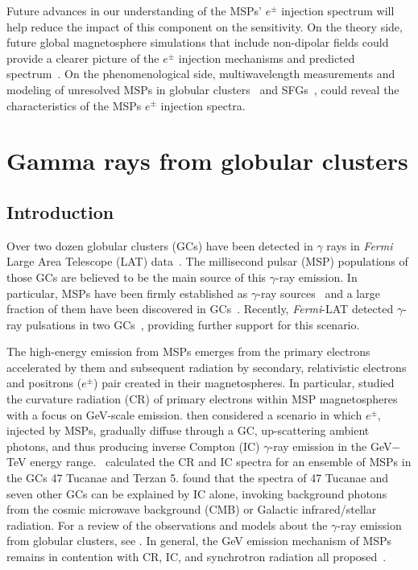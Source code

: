 \documentclass[doublespace,draft,nopageskip]{VTthesis} %
\begin{document}
Future advances in our understanding of the MSPs' $e^\pm$ injection spectrum will help reduce the impact of this component on the sensitivity. On the theory side, future global magnetosphere simulations that include non-dipolar fields could provide a clearer picture of the $e^\pm$ injection mechanisms and predicted spectrum~\citep{Harding:2021yuv}. On the phenomenological side, multiwavelength measurements and modeling of unresolved MSPs in globular clusters~\citep{Ndiyavala:2017hoh, Song:2021zrs} and SFGs~\citep{Sudoh:2020hyu}, could reveal the characteristics of the MSPs $e^\pm$ injection spectra. 

\chapter{Gamma rays from globular clusters} \label{ch:globular_cluster}

\section{Introduction}\label{sec:intro}

Over two dozen globular clusters (GCs) have been detected in $\gamma$ rays in {\it Fermi} Large Area Telescope (LAT) data~\citep{2009Sci...325..845A,2010A&A...524A..75A,2010ApJ...712L..36K,2011ApJ...729...90T,2015MNRAS.448.3215Z,2016MNRAS.459...99Z}. The millisecond pulsar (MSP) populations of those GCs are believed to be the main source of this $\gamma$-ray emission. In particular, MSPs have been firmly established as $\gamma$-ray sources~\citep{1996A&A...311L...9V,2009ApJ...699.1171A,2013MNRAS.430..571E,2013ApJS..208...17A} and a large fraction of them have been discovered in GCs~\citep{2005ASPC..328..147C}. Recently, \textit{Fermi}-LAT detected $\gamma$-ray pulsations in two GCs~\citep{2011Sci...334.1107F,2013ApJ...778..106J}, providing further support for this scenario.

The high-energy emission from MSPs emerges from the primary electrons accelerated by them and  subsequent radiation by secondary, relativistic electrons and positrons ($e^\pm$) pair created in their magnetospheres. In particular, \citet{2005ApJ...622..531H} studied the curvature radiation (CR) of primary electrons within MSP magnetospheres with a focus on GeV-scale emission. \citet{2007MNRAS.377..920B} then considered a scenario in which $e^\pm$, injected by MSPs, gradually diffuse through a GC, up-scattering ambient photons, and thus producing inverse Compton (IC) $\gamma$-ray emission in the GeV$-$TeV energy range.~\citet{2009ApJ...696L..52V} calculated the CR and IC spectra for an ensemble of MSPs in the GCs 47 Tucanae and Terzan 5. \citet{2010ApJ...723.1219C} found that the spectra of 47 Tucanae and seven other GCs can be explained by IC alone, invoking background photons from the cosmic microwave background (CMB) or Galactic infrared/stellar radiation. {For a review of the observations and models about the $\gamma$-ray emission from globular clusters, see \citet{2016JASS...33....1T}.} In general, the GeV emission mechanism of MSPs remains in contention with CR, IC, and synchrotron radiation all  proposed~\citep{2021arXiv210105751H}.
\end{document}
